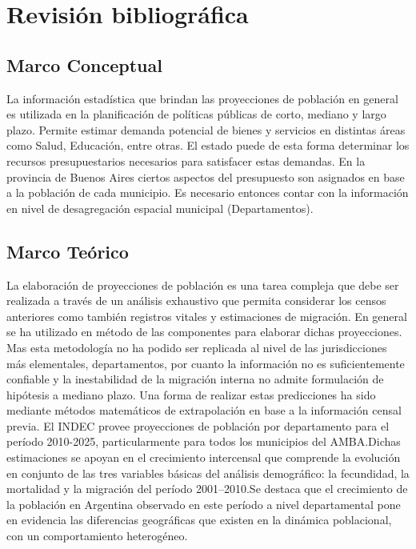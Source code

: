 \documentclass{article}
\theoremstyle{mytheoremstyle}
\theoremstyle{mytheoremstyle}
\theoremstyle{myproblemstyle}
\begin{document}
\section{Revisión bibliográfica}
\subsection{Marco Conceptual}
  La información estadística que brindan las proyecciones de población en general es utilizada en  la planificación
   de políticas públicas de corto, mediano y largo plazo.
   Permite estimar demanda potencial de bienes y servicios en distintas áreas como Salud, Educación, entre otras.\newline
   El estado puede de esta forma determinar los recursos presupuestarios necesarios para satisfacer estas demandas. 
   En la provincia de Buenos Aires ciertos aspectos del presupuesto son asignados en base a la población de cada municipio. 
   Es necesario entonces contar con la información en nivel de desagregación espacial municipal (Departamentos).
  \subsection{Marco Teórico}
  La elaboración de proyecciones de población es una tarea compleja que debe ser realizada a través de un
   análisis exhaustivo que permita considerar los censos anteriores como también registros vitales y
  estimaciones de migración.\newline
  En general se ha utilizado en método de las componentes para elaborar dichas proyecciones.
   Mas esta metodología no ha podido ser replicada al nivel de las 
   jurisdicciones más elementales, departamentos, por cuanto la información no es suficientemente confiable
    y la inestabilidad de la migración interna no admite formulación de hipótesis a mediano plazo.
    Una forma de realizar estas predicciones ha sido mediante métodos matemáticos de extrapolación en base
   a la información censal previa.\newline
  El INDEC provee proyecciones de población por departamento para el período 2010-2025, 
  particularmente para todos los municipios del AMBA.Dichas estimaciones se apoyan en el crecimiento intercensal que comprende la evolución en conjunto
  de las tres variables básicas del análisis demográfico: la fecundidad, la mortalidad y la migración del período
  2001--2010.Se destaca que el crecimiento de la población en Argentina observado en este período a nivel departamental 
  pone en evidencia las diferencias geográficas que existen en la dinámica poblacional, con un comportamiento heterogéneo.
  
\end{document}
